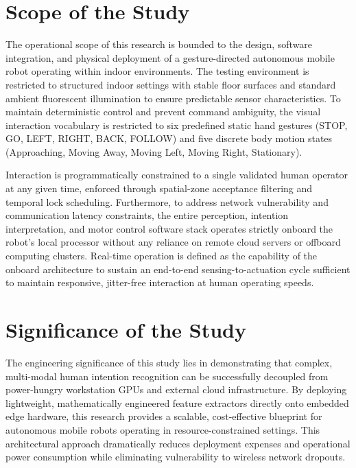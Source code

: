 \section{Scope of the Study}
The operational scope of this research is bounded to the design, software integration, and physical deployment of a gesture-directed autonomous mobile robot operating within indoor environments. The testing environment is restricted to structured indoor settings with stable floor surfaces and standard ambient fluorescent illumination to ensure predictable sensor characteristics. To maintain deterministic control and prevent command ambiguity, the visual interaction vocabulary is restricted to six predefined static hand gestures (STOP, GO, LEFT, RIGHT, BACK, FOLLOW) and five discrete body motion states (Approaching, Moving Away, Moving Left, Moving Right, Stationary). 

Interaction is programmatically constrained to a single validated human operator at any given time, enforced through spatial-zone acceptance filtering and temporal lock scheduling. Furthermore, to address network vulnerability and communication latency constraints, the entire perception, intention interpretation, and motor control software stack operates strictly onboard the robot's local processor without any reliance on remote cloud servers or offboard computing clusters. Real-time operation is defined as the capability of the onboard architecture to sustain an end-to-end sensing-to-actuation cycle sufficient to maintain responsive, jitter-free interaction at human operating speeds.

\section{Significance of the Study}
The engineering significance of this study lies in demonstrating that complex, multi-modal human intention recognition can be successfully decoupled from power-hungry workstation GPUs and external cloud infrastructure. By deploying lightweight, mathematically engineered feature extractors directly onto embedded edge hardware, this research provides a scalable, cost-effective blueprint for autonomous mobile robots operating in resource-constrained settings. This architectural approach dramatically reduces deployment expenses and operational power consumption while eliminating vulnerability to wireless network dropouts.

